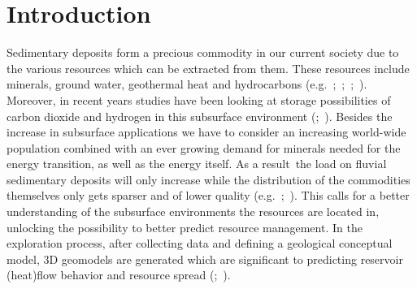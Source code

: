 \chapter{Introduction}
Sedimentary deposits form a precious commodity in our current society due to the various resources which can be extracted from them. 
These resources include minerals, ground water, geothermal heat and hydrocarbons (e.g.~\cite{morris2007genesis};~\cite{donselaar2017relation};~\cite{donselaar2015reservoir};~\cite{brekke2001sedimentary}). 
Moreover, in recent years studies have been looking at storage possibilities of carbon dioxide and hydrogen in this subsurface environment (\cite{zhou2020dynamic};~\cite{heinemann2021enabling}). 
Besides the increase in subsurface applications we have to consider an increasing world-wide population combined with an ever growing demand for minerals needed for the energy transition, as well as the energy itself. 
As a result~the load on fluvial sedimentary deposits will only increase while the distribution of the commodities themselves only gets sparser and of lower quality (e.g.~\cite{spittler2020modelling};~\cite{calvo2016decreasing}). 
This calls for a better understanding of the subsurface environments the resources are located in, unlocking the possibility to better predict resource management. In the exploration process, after collecting data and defining a geological conceptual model, 3D geomodels are generated which are significant to predicting reservoir (heat)flow behavior and resource spread (\cite{song2022review};~\cite{royer20153d}).
